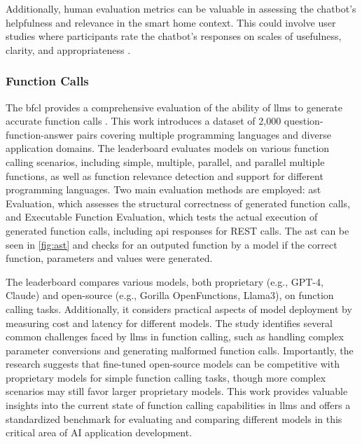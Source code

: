 Additionally, human evaluation metrics can be valuable in assessing the chatbot's helpfulness and relevance in the smart home context. This could involve user studies where participants rate the chatbot's responses on scales of usefulness, clarity, and appropriateness \cite{guo2023evaluatinglargelanguagemodels}.

\subsubsection{Function Calls}
The \gls{bfcl} provides a comprehensive evaluation of the ability of \glspl{llm} to generate accurate function calls \cite{berkeley-function-calling-leaderboard}. 
This work introduces a dataset of 2,000 question-function-answer pairs covering multiple programming languages and diverse application domains. 
The leaderboard evaluates models on various function calling scenarios, including simple, multiple, parallel, and parallel multiple functions, as well as function relevance detection and support for different programming languages. 
Two main evaluation methods are employed: \gls{ast} Evaluation, which assesses the structural correctness of generated function calls, and Executable Function Evaluation, which tests the actual execution of generated function calls, including \gls{api} responses for REST calls.
The \gls{ast} can be seen in \cref{fig:ast} and checks for an outputed function by a model if the correct function, parameters and values were generated.

The leaderboard compares various models, both proprietary (e.g., GPT-4, Claude) and open-source (e.g., Gorilla OpenFunctions, Llama3), on function calling tasks. 
Additionally, it considers practical aspects of model deployment by measuring cost and latency for different models. 
The study identifies several common challenges faced by \glspl{llm} in function calling, such as handling complex parameter conversions and generating malformed function calls. 
Importantly, the research suggests that fine-tuned open-source models can be competitive with proprietary models for simple function calling tasks, though more complex scenarios may still favor larger proprietary models. 
This work provides valuable insights into the current state of function calling capabilities in \glspl{llm} and offers a standardized benchmark for evaluating and comparing different models in this critical area of AI application development.

